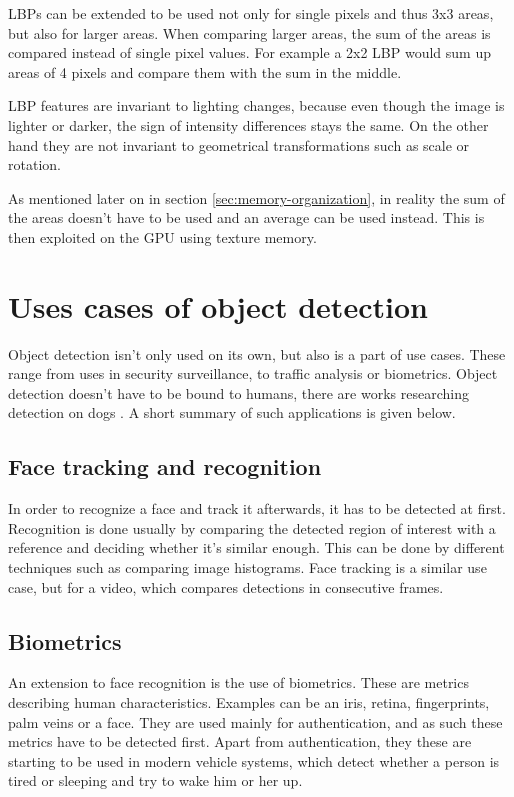 LBPs can be extended to be used not only for single pixels and thus 3x3 areas, but also for larger areas. When comparing larger areas, the sum of the areas is compared instead of single pixel values. For example a 2x2 LBP would sum up areas of 4 pixels and compare them with the sum in the middle.

LBP features are invariant to lighting changes, because even though the image is lighter or darker, the sign of intensity differences stays the same. On the other hand they are not invariant to geometrical transformations such as scale or rotation.

As mentioned later on in section \ref{sec:memory-organization}, in reality the sum of the areas doesn't have to be used and an average can be used instead. This is then exploited on the GPU using texture memory.

\section{Uses cases of object detection}\label{sec:use-cases}

Object detection isn't only used on its own, but also is a part of use cases. These range from uses in security surveillance, to traffic analysis or biometrics. Object detection doesn't have to be bound to humans, there are works researching detection on dogs \cite{juranek2008dogs}. A short summary of such applications is given below.

\subsection{Face tracking and recognition}\label{subsec:uc-face-tracking}

In order to recognize a face and track it afterwards, it has to be detected at first. Recognition is done usually by comparing the detected region of interest with a reference and deciding whether it's similar enough. This can be done by different techniques such as comparing image histograms. Face tracking is a similar use case, but for a video, which compares detections in consecutive frames.

\subsection{Biometrics}\label{subsec:uc-biometrics}

An extension to face recognition is the use of biometrics. These are metrics describing human characteristics. Examples can be an iris, retina, fingerprints, palm veins or a face. They are used mainly for authentication, and as such these metrics have to be detected first. Apart from authentication, they these are starting to be used in modern vehicle systems, which detect whether a person is tired or sleeping and try to wake him or her up.

